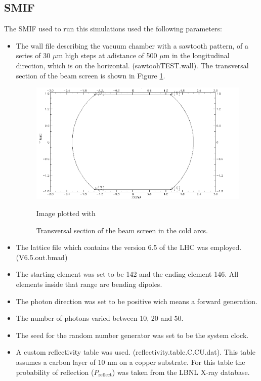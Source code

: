 \subsection{SMIF}
The SMIF used to run this simulations used the following parameters:
\begin{itemize}
\item The wall file describing the vacuum chamber with a sawtooth pattern, of a series of 30 $\mu$m high steps at adistance of 500 $\mu$m in the longitudinal direction, which is on the horizontal. (sawtoohTEST.wall). The transversal section of the beam screen is shown in Figure \ref{fig:xy}.

\begin{figure}
	\centering
  \begin{minipage}{\textwidth}
  	\centering
   	\includegraphics[width=5.5in]{Pictures/transsect.jpg}
  		\caption{\label{fig:xy}
   			Transversal section of the beam screen in the cold arcs. }
   			\footnotesize{Image plotted with \srthree}
   \end{minipage}
\end{figure}
\item The lattice file which contains the version 6.5 of the LHC was employed. (V6.5.out.bmad)
\item The starting element was set to be 142 and the ending element 146. All elements inside that range are bending dipoles.
\item The photon direction was set to be positive wich means a forward generation.
\item The number of photons varied between 10, 20 and 50.
\item The seed for the random number generator was set to be the system clock.
\item A custom reflectivity table was used. (reflectivity.table.C.CU.dat). This table assumes a carbon layer of 10 nm on a copper substrate. For this table the probability of reflection ($P_{\textrm{reflect}}$) was taken from the LBNL X-ray database\cite{lbnl}.
\end{itemize} 

